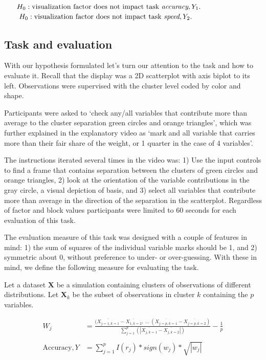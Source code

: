 \documentclass{monashthesis}
\begin{document}
\(~~~~~H_0: \text{visualization factor does not impact task } \textit{accuracy}, Y_1. \\\)
\(~~~~~~H_0: \text{visualization factor does not impact task } \textit{speed}, Y_2. \\\)

\hypertarget{sec:task}{%
\subsection{Task and evaluation}\label{sec:task}}

With our hypothesis formulated let's turn our attention to the task and how to evaluate it.
Recall that the display was a 2D scatterplot with axis biplot to its left. Observations were supervised with the cluster level coded by color and shape.

Participants were asked to `check any/all variables that contribute more than average to the cluster separation green circles and orange triangles', which was further explained in the explanatory video as `mark and all variable that carries more than their fair share of the weight, or 1 quarter in the case of 4 variables'.

The instructions iterated several times in the video was: 1) Use the input controls to find a frame that contains separation between the clusters of green circles and orange triangles, 2) look at the orientation of the variable contributions in the gray circle, a visual depiction of basis, and 3) select all variables that contribute more than average in the direction of the separation in the scatterplot. Regardless of factor and block values participants were limited to 60 seconds for each evaluation of this task.

The evaluation measure of this task was designed with a couple of features in mind: 1) the sum of squares of the individual variable marks should be 1, and 2) symmetric about 0, without preference to under- or over-guessing. With these in mind, we define the following measure for evaluating the task.

Let a dataset \(\textbf{X}\) be a simulation containing clusters of observations of different distributions. Let \(\textbf{X}_k\) be the subset of observations in cluster \(k\) containing the \(p\) variables.

\begin{align*}
W_{j} &=\frac
{(\overline{X_{j=1, k=1}} - \overline{X_{1, k=2}}, ~...~
(\overline{X_{j=p, k=1}} - \overline{X_{j=p, k=2}})}
{\sum_{j=1}^{p}(|\overline{X_{j,k=1}} - \overline{X_{j,k=2}}|)}
- \frac{1}{p} \\
\\
\text{Accuracy}, Y &= \sum_{j=1}^{p}I(r_j) * sign(w_j) * \sqrt{|w_j|}  \\
\end{align*}
\end{document}
